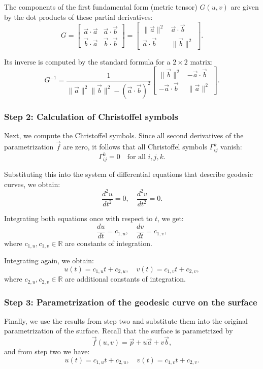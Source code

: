 \documentclass{article}
\begin{document}
	The components of the first fundamental form (metric tensor) $G(u, v)$ are given by the dot products of these partial derivatives:
	\[
	G = 
	\begin{bmatrix}
		\vec{a} \cdot \vec{a} & \vec{a} \cdot \vec{b} \\
		\vec{b} \cdot \vec{a} & \vec{b} \cdot \vec{b}
	\end{bmatrix}
	=
	\begin{bmatrix}
		\|\vec{a}\|^2 & \vec{a} \cdot \vec{b} \\
		\vec{a} \cdot \vec{b} & \|\vec{b}\|^2
	\end{bmatrix}.
	\]
	
	Its inverse is computed by the standard formula for a $2 \times 2$ matrix:
	\[
	G^{-1} = \frac{1}{\|\vec{a}\|^2 \|\vec{b}\|^2 - (\vec{a} \cdot \vec{b})^2}
	\begin{bmatrix}
		\|\vec{b}\|^2 & -\vec{a} \cdot \vec{b} \\
		-\vec{a} \cdot \vec{b} & \|\vec{a}\|^2
	\end{bmatrix}.
	\]
	
	\subsubsection{Step 2: Calculation of Christoffel symbols}
	
	Next, we compute the Christoffel symbols. Since all second derivatives of the parametrization $\vec{f}$ are zero, it follows that all Christoffel symbols $\Gamma^k_{ij}$ vanish:
	\[
	\Gamma^k_{ij} = 0 \quad \text{for all } i, j, k.
	\]
	
	Substituting this into the system of differential equations that describe geodesic curves, we obtain:
	\[
	\frac{d^2 u}{dt^2} = 0, \quad \frac{d^2 v}{dt^2} = 0.
	\]
	
	Integrating both equations once with respect to $t$, we get:
	\[
	\frac{du}{dt} = c_{1,u}, \quad \frac{dv}{dt} = c_{1,v},
	\]
	where $c_{1,u}, c_{1,v} \in \mathbb{R}$ are constants of integration.
	
	Integrating again, we obtain:
	\[
	u(t) = c_{1,u} t + c_{2,u}, \quad v(t) = c_{1,v} t + c_{2,v},
	\]
	where $c_{2,u}, c_{2,v} \in \mathbb{R}$ are additional constants of integration.
	\newpage

	\subsubsection{Step 3: Parametrization of the geodesic curve on the surface}
	Finally, we use the results from step two and substitute them into the original parametrization of the surface. Recall that the surface is parametrized by
	\[
	\vec{f}(u, v) = \vec{p} + u \vec{a} + v \vec{b},
	\]
	and from step two we have:
	\[
	u(t) = c_{1,u} t + c_{2,u}, \quad v(t) = c_{1,v} t + c_{2,v}.
	\]
	
\end{document}
